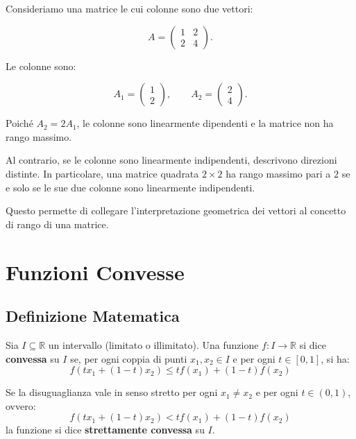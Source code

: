 Consideriamo una matrice le cui colonne sono due vettori:

\[
A=
\begin{pmatrix}
1 & 2\\
2 & 4
\end{pmatrix}.
\]

Le colonne sono:

\[
A_1=
\begin{pmatrix}
1\\
2
\end{pmatrix},
\qquad
A_2=
\begin{pmatrix}
2\\
4
\end{pmatrix}.
\]

Poiché \(A_2=2A_1\), le colonne sono linearmente dipendenti e la matrice non ha rango massimo.

Al contrario, se le colonne sono linearmente indipendenti, descrivono direzioni distinte. In particolare, una matrice quadrata \(2\times 2\) ha rango massimo pari a \(2\) se e solo se le sue due colonne sono linearmente indipendenti.

Questo permette di collegare l'interpretazione geometrica dei vettori al concetto di rango di una matrice.



\section{Funzioni Convesse}

\subsection{Definizione Matematica}

Sia $I \subseteq \mathbb{R}$ un intervallo (limitato o illimitato). Una funzione $f: I \to \mathbb{R}$ si dice \textbf{convessa} su $I$ se, per ogni coppia di punti $x_1, x_2 \in I$ e per ogni $t \in [0, 1]$, si ha:
\begin{equation}
    f(t x_1 + (1-t) x_2) \le t f(x_1) + (1-t) f(x_2)
\end{equation}

Se la disuguaglianza vale in senso stretto per ogni $x_1 \neq x_2$ e per ogni $t \in (0, 1)$, ovvero:
\begin{equation}
    f(t x_1 + (1-t) x_2) < t f(x_1) + (1-t) f(x_2)
\end{equation}
la funzione si dice \textbf{strettamente convessa} su $I$.

